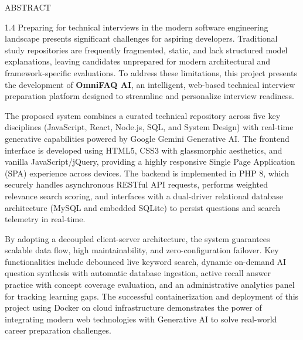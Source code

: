 \begin{center}
{\HeadingFont ABSTRACT}
\end{center}

\vspace{1.0cm}

\begin{spacing}{1.4}
\justifying
\noindent
Preparing for technical interviews in the modern software engineering landscape presents significant challenges for aspiring developers. Traditional study repositories are frequently fragmented, static, and lack structured model explanations, leaving candidates unprepared for modern architectural and framework-specific evaluations. To address these limitations, this project presents the development of \textbf{OmniFAQ AI}, an intelligent, web-based technical interview preparation platform designed to streamline and personalize interview readiness.

\vspace{0.4cm}
\noindent
The proposed system combines a curated technical repository across five key disciplines (JavaScript, React, Node.js, SQL, and System Design) with real-time generative capabilities powered by Google Gemini Generative AI. The frontend interface is developed using HTML5, CSS3 with glassmorphic aesthetics, and vanilla JavaScript/jQuery, providing a highly responsive Single Page Application (SPA) experience across devices. The backend is implemented in PHP 8, which securely handles asynchronous RESTful API requests, performs weighted relevance search scoring, and interfaces with a dual-driver relational database architecture (MySQL and embedded SQLite) to persist questions and search telemetry in real-time.

\vspace{0.4cm}
\noindent
By adopting a decoupled client-server architecture, the system guarantees scalable data flow, high maintainability, and zero-configuration failover. Key functionalities include debounced live keyword search, dynamic on-demand AI question synthesis with automatic database ingestion, active recall answer practice with concept coverage evaluation, and an administrative analytics panel for tracking learning gaps. The successful containerization and deployment of this project using Docker on cloud infrastructure demonstrates the power of integrating modern web technologies with Generative AI to solve real-world career preparation challenges.

\end{spacing}

